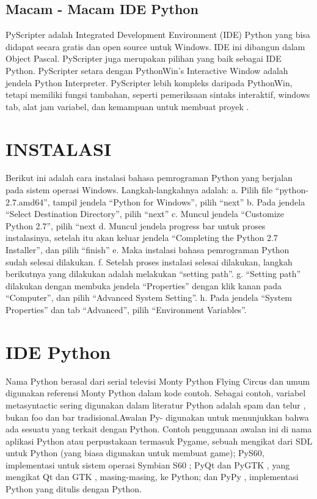 \subsection{Macam - Macam IDE Python}
PyScripter adalah Integrated Development Environment (IDE) Python yang bisa didapat secara gratis  dan open source untuk Windows. IDE ini dibangun dalam Object Pascal. PyScripter juga merupakan pilihan yang baik sebagai IDE Python. PyScripter setara dengan PythonWin’s Interactive Window adalah jendela Python Interpreter. PyScripter lebih kompleks daripada PythonWin, tetapi memiliki fungsi tambahan, seperti pemeriksaan sintaks interaktif, windows tab, alat jam variabel, dan kemampuan untuk membuat proyek \cite{tateosian2015beginning}.

\section{INSTALASI}
Berikut ini adalah cara instalasi bahasa pemrograman Python yang berjalan pada sistem operasi Windows. Langkah-langkahnya adalah: 
a. Pilih file “python-2.7.amd64”, tampil jendela “Python for Windows”, pilih “next” 
b. Pada jendela “Select Destination Directory”, pilih “next”
 c. Muncul jendela “Customize Python 2.7”, pilih “next
 d. Muncul jendela progress bar untuk proses instalasinya, setelah itu akan keluar jendela “Completing the Python 2.7 Installer”, dan pilih “finish” 
 e. Maka instalasi bahasa pemrograman Python sudah selesai dilakukan. 
 f. Setelah proses instalasi selesai dilakukan, langkah berikutnya yang dilakukan adalah melakukan “setting path”. 
 g. “Setting path” dilakukan dengan membuka jendela “Properties” dengan klik kanan pada “Computer”, dan pilih “Advanced System Setting”. 
 h. Pada jendela “System Properties” dan tab “Advanced”, pilih “Environment Variables”\cite{wicaksana2013user}.

\section{IDE Python}
Nama Python berasal dari serial televisi Monty Python Flying Circus dan umum digunakan referensi Monty Python dalam kode contoh. Sebagai contoh, variabel metasyntactic sering digunakan dalam literatur Python adalah spam dan telur , bukan foo dan bar tradisional.Awalan Py- digunakan untuk menunjukkan bahwa ada sesuatu yang terkait dengan Python. Contoh penggunaan awalan ini di nama aplikasi Python atau perpustakaan termasuk Pygame, sebuah mengikat dari SDL untuk Python (yang biasa digunakan untuk membuat game); PyS60, implementasi untuk sistem operasi Symbian S60 ; PyQt dan PyGTK , yang mengikat Qt dan GTK , masing-masing, ke Python; dan PyPy , implementasi Python yang ditulis dengan Python. \cite{van2007python}

